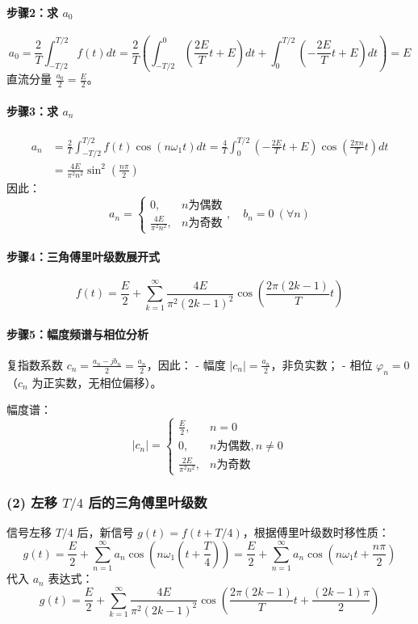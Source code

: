 \paragraph{步骤2：求 \( a_0 \)}
\[
a_0 = \frac{2}{T}\int_{-T/2}^{T/2} f(t)dt = \frac{2}{T}\left(\int_{-T/2}^0 \left(\frac{2E}{T}t+E\right)dt + \int_0^{T/2} \left(-\frac{2E}{T}t+E\right)dt\right) = E
\]
直流分量 \( \frac{a_0}{2} = \frac{E}{2} \)。

\paragraph{步骤3：求 \( a_n \)}
\[
\begin{aligned}
a_n &= \frac{2}{T}\int_{-T/2}^{T/2} f(t)\cos(n\omega_1 t)dt = \frac{4}{T}\int_0^{T/2} \left(-\frac{2E}{T}t+E\right)\cos\left(\frac{2\pi n}{T}t\right)dt \\
&= \frac{4E}{\pi^2 n^2}\sin^2\left(\frac{n\pi}{2}\right)
\end{aligned}
\]
因此：
\[
\boxed{
a_n =
\begin{cases}
0, & n\text{为偶数} \\
\frac{4E}{\pi^2 n^2}, & n\text{为奇数}
\end{cases}, \quad b_n=0 \ (\forall n)
}
\]

\paragraph{步骤4：三角傅里叶级数展开式}
\[
\boxed{f(t) = \frac{E}{2} + \sum_{k=1}^{\infty} \frac{4E}{\pi^2 (2k-1)^2} \cos\left(\frac{2\pi(2k-1)}{T}t\right)}
\]

\paragraph{步骤5：幅度频谱与相位分析}
复指数系数 \( c_n = \frac{a_n - jb_n}{2} = \frac{a_n}{2} \)，因此：
- 幅度 \( |c_n| = \frac{a_n}{2} \)，非负实数；
- 相位 \( \varphi_n = 0 \)（$c_n$ 为正实数，无相位偏移）。

幅度谱：
\[
|c_n| =
\begin{cases}
\frac{E}{2}, & n=0 \\
0, & n\text{为偶数}, n\neq0 \\
\frac{2E}{\pi^2 n^2}, & n\text{为奇数}
\end{cases}
\]

\subsubsection{(2) 左移 \( T/4 \) 后的三角傅里叶级数}
信号左移 \( T/4 \) 后，新信号 \( g(t) = f(t+T/4) \)，根据傅里叶级数时移性质：
\[
g(t) = \frac{E}{2} + \sum_{n=1}^{\infty} a_n \cos\left(n\omega_1\left(t+\frac{T}{4}\right)\right) = \frac{E}{2} + \sum_{n=1}^{\infty} a_n \cos\left(n\omega_1 t + \frac{n\pi}{2}\right)
\]
代入 \( a_n \) 表达式：
\[
\boxed{g(t) = \frac{E}{2} + \sum_{k=1}^{\infty} \frac{4E}{\pi^2 (2k-1)^2} \cos\left(\frac{2\pi(2k-1)}{T}t + \frac{(2k-1)\pi}{2}\right)}
\]

